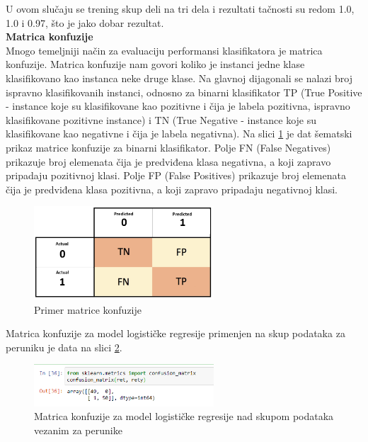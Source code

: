 \documentclass[a4paper,12pt]{report}
\begin{document}
U ovom slučaju se trening skup deli na tri dela i rezultati tačnosti su redom 1.0, 1.0 i 0.97, što je jako dobar rezultat.\\

\textbf{Matrica konfuzije}\\

Mnogo temeljniji način za evaluaciju performansi klasifikatora je matrica konfuzije. Matrica konfuzije nam govori koliko je instanci jedne klase klasifikovano kao instanca neke druge klase. Na glavnoj dijagonali se nalazi broj ispravno klasifikovanih instanci, odnosno za binarni klasifikator TP (True Positive - instance koje su klasifikovane kao pozitivne i čija je labela pozitivna, ispravno klasifikovane pozitivne instance) i TN (True Negative - 
instance koje su klasifikovane kao negativne i čija je labela negativna). Na slici \ref{fig:confussion} je dat šematski prikaz matrice konfuzije za binarni klasifikator. Polje FN (False Negatives) prikazuje broj elemenata čija je predviđena klasa negativna, a koji zapravo pripadaju pozitivnoj klasi.  Polje FP (False Positives) prikazuje broj elemenata čija je predviđena klasa pozitivna, a koji zapravo pripadaju negativnoj klasi.\\

\begin{figure}[h]
    \centering
    \includegraphics[width=0.6\textwidth]{confusion_matrix.jpg}
    \caption{Primer matrice konfuzije}\label{fig:confussion}
\end{figure}

Matrica konfuzije za model logističke regresije primenjen na skup podataka za peruniku je data na slici \ref{fig:confusioniris}.

\begin{figure}[h]
    \centering
    \includegraphics[width=0.6\textwidth]{logistic_confusion.png}
    \caption{Matrica konfuzije za model logističke regresije nad skupom podataka vezanim za perunike}\label{fig:confusioniris}
\end{figure}
\end{document}

